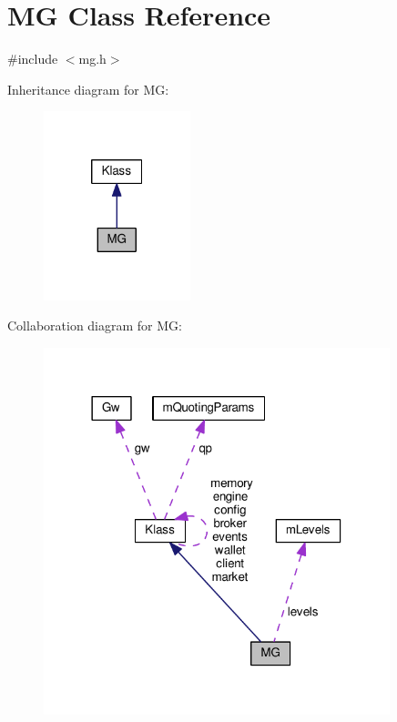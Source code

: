\hypertarget{class_k_1_1_m_g}{}\section{MG Class Reference}
\label{class_k_1_1_m_g}


{\ttfamily \#include $<$mg.\+h$>$}



Inheritance diagram for MG\+:
\nopagebreak
\begin{figure}[H]
\begin{center}
\leavevmode
\includegraphics[width=121pt]{class_k_1_1_m_g__inherit__graph}
\end{center}
\end{figure}


Collaboration diagram for MG\+:
\nopagebreak
\begin{figure}[H]
\begin{center}
\leavevmode
\includegraphics[width=285pt]{class_k_1_1_m_g__coll__graph}
\end{center}
\end{figure}
